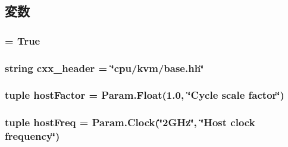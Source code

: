 \subsection{変数}
\hypertarget{classBaseKvmCPU_1_1BaseKvmCPU_a17fa61ac3806b481cafee5593b55e5d0}{
\subsubsection[{abstract}]{ = True}}
\label{classBaseKvmCPU_1_1BaseKvmCPU_a17fa61ac3806b481cafee5593b55e5d0}
\hypertarget{classBaseKvmCPU_1_1BaseKvmCPU_a17da7064bc5c518791f0c891eff05fda}{
\subsubsection[{cxx\_\-header}]{\setlength{\rightskip}{0pt plus 5cm}string {\bf cxx\_\-header} = \char`\"{}cpu/kvm/base.hh\char`\"{}}}
\label{classBaseKvmCPU_1_1BaseKvmCPU_a17da7064bc5c518791f0c891eff05fda}
\hypertarget{classBaseKvmCPU_1_1BaseKvmCPU_a8c73f4ae67c9de430bfe72e25c2426d9}{
\subsubsection[{hostFactor}]{\setlength{\rightskip}{0pt plus 5cm}tuple {\bf hostFactor} = Param.Float(1.0, \char`\"{}Cycle scale factor\char`\"{})}}
\label{classBaseKvmCPU_1_1BaseKvmCPU_a8c73f4ae67c9de430bfe72e25c2426d9}
\hypertarget{classBaseKvmCPU_1_1BaseKvmCPU_a0056ec65331f3739ec47a849738aeebe}{
\subsubsection[{hostFreq}]{\setlength{\rightskip}{0pt plus 5cm}tuple {\bf hostFreq} = Param.Clock(\char`\"{}2GHz\char`\"{}, \char`\"{}Host clock frequency\char`\"{})}}
